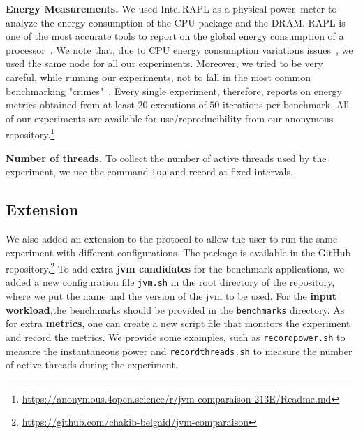 
\noindent\textbf{Energy Measurements.}
We used Intel\,RAPL as a physical power~meter to analyze the energy consumption of the CPU package and the DRAM.
RAPL is one of the most accurate tools to report on the global energy consumption of a processor~\cite{Khan:2018:RAE:3199681.3177754,10.1145/2989081.2989088}.
We note that, due to CPU energy consumption variations issues~\cite{opaper}, we used the same node for all our experiments.
Moreover, we tried to be very careful, while running our experiments, not to fall in the most common benchmarking "crimes"~\cite{DBLP:journals/corr/abs-1801-02381}.
Every single experiment, therefore, reports on energy metrics obtained from at least $20$ executions of $50$ iterations per benchmark.
All of our experiments are available for use/reproducibility from our anonymous repository.\footnote{\url{https://anonymous.4open.science/r/jvm-comparaison-213E/Readme.md}}


\noindent\textbf{Number of threads.}
To collect the number of active threads used by the experiment, we use the command \texttt{top} and record at fixed intervals.

\subsection{Extension}
We also added an extension to the protocol to allow the user to run the same experiment with different configurations.
The package is available in the GitHub repository.\footnote{\url{https://github.com/chakib-belgaid/jvm-comparaison}}
To add extra \textbf{jvm candidates} for the benchmark applications, we added a new configuration file \texttt{jvm.sh} in the root directory of the repository, where we put the name and the version of the jvm to be used.
For the \textbf{input workload},the benchmarks should be provided in the \texttt{benchmarks} directory.
As for extra \textbf{metrics}, one can create a new script file that monitors the experiment and record the metrics.
We provide some examples, such as \texttt{recordpower.sh} to measure the instantaneous power and \texttt{recordthreads.sh} to measure the number of active threads during the experiment.

